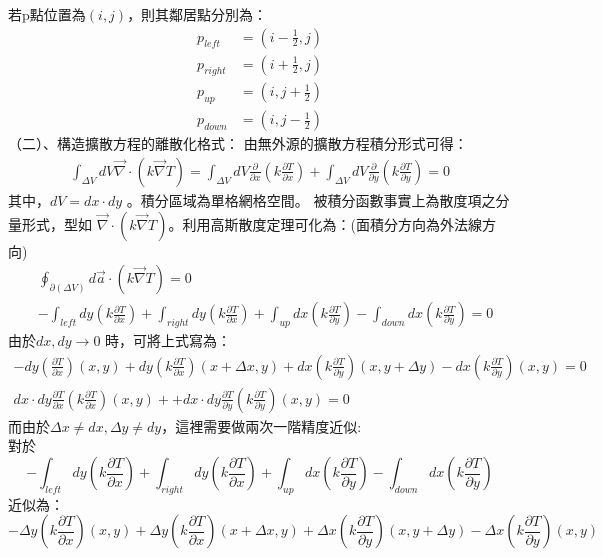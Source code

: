 \documentclass[12pt]{article}
\begin{document}
若p點位置為$(i,j)$，則其鄰居點分別為：
\begin{equation}
    \begin{split}
        p_{left} &= (i-\frac{1}{2},j)\\
        p_{right} &= (i+\frac{1}{2},j)\\
        p_{up} &= (i,j+\frac{1}{2})\\
        p_{down} &= (i,j-\frac{1}{2})
    \end{split}
\end{equation}
\noindent （二）、構造擴散方程的離散化格式：
\noindent 由無外源的擴散方程積分形式可得：
\begin{align}
    \int_{\Delta V} dV\vec{\nabla} \cdot (k \vec{\nabla} T) =   \int_{\Delta V} dV \frac{\partial }{\partial x}(k \frac{\partial T }{\partial x}) + \int_{\Delta V} dV \frac{\partial }{\partial y}(k \frac{\partial T }{\partial y}) = 0
\end{align}
\noindent 其中，$dV = dx\cdot dy$ 。積分區域為單格網格空間。
\noindent 被積分函數事實上為散度項之分量形式，型如 $\vec{\nabla} \cdot (k \vec{\nabla} T)$。利用高斯散度定理可化為：(面積分方向為外法線方向)
\begin{align}
    &\oint_{\partial (\Delta V)} d\vec{a} \cdot (k \vec{\nabla} T) = 0\\
    &-\int_{left} dy (k \frac{\partial T }{\partial x}) +\int_{right} dy (k \frac{\partial T }{\partial x})
    +\int_{up} dx (k \frac{\partial T }{\partial y}) - \int_{down} dx (k \frac{\partial T }{\partial y})
    = 0 
\end{align}
\noindent 由於$dx ,dy \rightarrow 0 $ 時，可將上式寫為：
\begin{align}
-dy ( \frac{\partial T }{\partial x})(x,y) +dy (k \frac{\partial T }{\partial x})(x+\Delta x,y)
+dx (k \frac{\partial T }{\partial y})(x,y+\Delta y) -dx (k \frac{\partial T }{\partial y})(x,y)
= 0\\
dx\cdot dy\frac{\partial T }{\partial x} (k \frac{\partial T }{\partial x})(x,y) +
+dx\cdot dy\frac{\partial T }{\partial y} (k \frac{\partial T }{\partial y})(x,y) 
= 0
\end{align}
\noindent 而由於$\Delta x \neq dx ,\Delta y \neq dy $，這裡需要做兩次一階精度近似:\\
\noindent 對於$$-\int_{left} dy (k \frac{\partial T }{\partial x}) +\int_{right} dy (k \frac{\partial T }{\partial x})
    +\int_{up} dx (k \frac{\partial T }{\partial y}) - \int_{down} dx (k \frac{\partial T }{\partial y})
    $$近似為：$$-\Delta y ( k\frac{\partial T }{\partial x})(x,y) +\Delta y (k \frac{\partial T }{\partial x})(x+\Delta x,y)
+\Delta x (k \frac{\partial T }{\partial y})(x,y+\Delta y) -\Delta x (k \frac{\partial T }{\partial y})(x,y)
$$
\end{document}
